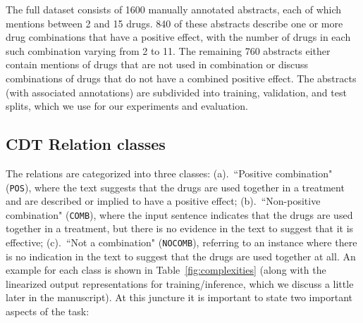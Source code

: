 \documentclass[conference]{IEEEtran}
\begin{document}
The full dataset consists of 1600 manually annotated abstracts, each of which mentions between 2 and 15 drugs. 840 of these abstracts describe one or more drug combinations that have a positive effect, with the number of drugs in each such combination varying from 2 to 11. The remaining 760 abstracts either contain mentions of drugs that are not used in combination or discuss combinations of drugs that do not have a combined positive effect. The abstracts (with associated annotations) are subdivided into training, validation, and test splits, which we use for our experiments and evaluation. 


\subsection{CDT Relation classes}
\label{sec-classes}
The relations are categorized into three classes: (a).~``Positive combination" (\texttt{POS}), where the text suggests that the drugs are used together in a treatment and are described or implied to have a positive effect; (b).~``Non-positive combination" (\texttt{COMB}), where the input sentence indicates that the drugs are used together in a treatment, but there is no evidence in the text to suggest that it is effective; (c).~``Not a combination" (\texttt{NOCOMB}), referring to an instance where there is no indication in the text to suggest that the drugs are used together at all.
An example for each class is shown in Table~\ref{fig:complexities} (along with the linearized output representations for training/inference, which we discuss a little later in the manuscript). 
At this juncture it is important to state two important aspects of the task:
\end{document}
